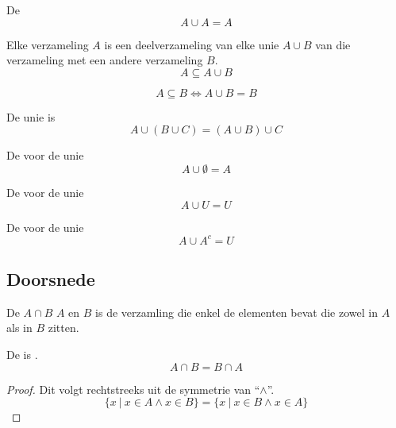 \documentclass[main.tex]{subfiles}
\begin{document}
\begin{ei}
  De 
  \[ A \cup A = A \]
\end{ei}

\begin{st}
  Elke verzameling $A$ is een deelverzameling van elke unie $A \cup B$ van die verzameling met een andere verzameling $B$.
  \[ A \subseteq A \cup B \]
\end{st}

\begin{st}
  \[ A \subseteq B \Leftrightarrow A \cup B = B \]
\end{st}

\begin{st}
  De unie is 
  \[ A \cup (B \cup C) = (A \cup B) \cup C \]
\end{st}

\begin{st}
  De  voor de unie
  \[ A \cup \emptyset = A \]
\end{st}

\begin{st}
  De  voor de unie
  \[ A \cup U = U \]
\end{st}

\begin{st}
  De  voor de unie
  \[ A \cup A^{c} = U \]
\end{st}

\subsection{Doorsnede}
\label{sec:doorsnede}

\begin{de}
  De  $A \cap B$  $A$ en $B$ is de verzamling die enkel de elementen bevat die zowel in $A$ als in $B$ zitten.
\end{de}

\begin{ei}
  De  is .
  \[ A \cap B = B \cap A \]
  \begin{proof}
    Dit volgt rechtstreeks uit de symmetrie van ``$\wedge$''.
    \[ \{ x\ |\ x \in A \wedge x \in B\} = \{ x\ |\ x \in B \wedge x \in A\} \]
  \end{proof}
\end{ei}
\end{document}
